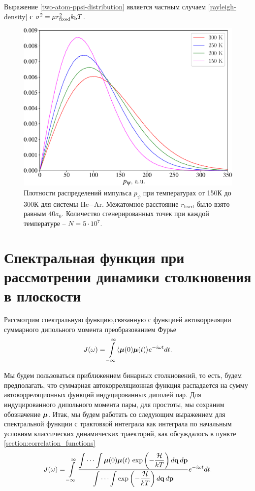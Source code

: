 Выражение \eqref{two-atom-ppsi-distribution} является частным случаем \eqref{rayleigh-density} с $\sigma^2 = \mu r_\text{fixed}^2 k_\text{b} T$.

\begin{figure}[H]
    \centering
    \includegraphics[width=0.75\linewidth]{./pictures/two_atom_distributions/pPsi-crop.pdf}
    \caption{Плотности распределений импульса $p_\psi$ при температурах от 150К до 300К для системы He$-$Ar. Межатомное расстояние $r_\text{fixed}$ было взято равным $40a_0$. Количество сгенерированных точек при каждой температуре -- $N = 5 \cdot 10^7$.}
\end{figure}

\section{Спектральная функция при рассмотрении динамики столкновения в плоскости}

Рассмотрим спектральную функцию,связанную с функцией автокорреляции суммарного дипольного момента преобразованием Фурье
\begin{gather}
    J(\omega) = \int\limits_{-\infty}^\infty \langle  \boldsymbol{\mu}(0) \boldsymbol{\mu}(t)  \rangle e^{-i \omega t} dt.
\end{gather}

Мы будем пользоваться приближением бинарных столкновений, то есть, будем предполагать, что суммарная автокорреляционная функция распадается на сумму автокорреляционных функций индуцированных диполей пар. Для индуцированного дипольного момента пары, для простоты, мы сохраним обозначение $\boldsymbol{\mu}$. Итак, мы будем работать со следующим выражением для спектральной функции с трактовкой интеграла как интеграла по начальным условиям классических динамических траекторий, как обсуждалось в пункте \ref{section:correlation_functions} 
\begin{gather}
    J(\omega) = \int\limits_{-\infty}^\infty \frac{\displaystyle \idotsint \boldsymbol{\mu}(0) \boldsymbol{\mu}(t) \, \exp \left( -\frac{\mathcal{H}}{kT} \right) d\mathbf{q} \, d\mathbf{p}}{\displaystyle \idotsint \exp \left( -\frac{\mathcal{H}}{kT} \right) d\mathbf{q} \, d\mathbf{p}} e^{-i \omega t} dt. \label{two-atom-spectral-function1}
\end{gather}

